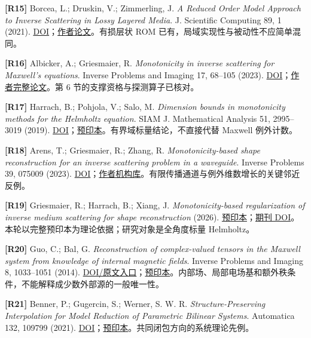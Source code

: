 \documentclass[11pt,a4paper]{article}
\begin{document}
\textbf{{[}R15{]}} Borcea, L.; Druskin, V.; Zimmerling, J. \emph{A
Reduced Order Model Approach to Inverse Scattering in Lossy Layered
Media}. J. Scientific Computing 89, 1 (2021).
\href{https://doi.org/10.1007/s10915-021-01616-7}{DOI}；\href{https://public.websites.umich.edu/~borcea/Publications/ROM_LOSSY.pdf}{作者论文}。有损层状
ROM 已有，局域实现性与被动性不应简单混同。

\textbf{{[}R16{]}} Albicker, A.; Griesmaier, R. \emph{Monotonicity in
inverse scattering for Maxwell's equations}. Inverse Problems and
Imaging 17, 68--105 (2023).
\href{https://doi.org/10.3934/ipi.2022032}{DOI}；\href{https://ianm.math.kit.edu/downloads/rg-ip/griesmaier/monotonicitymaxwell.pdf}{作者完整论文}。第
6 节的支撑资格与探测算子已核对。

\textbf{{[}R17{]}} Harrach, B.; Pohjola, V.; Salo, M. \emph{Dimension
bounds in monotonicity methods for the Helmholtz equation}. SIAM J.
Mathematical Analysis 51, 2995--3019 (2019).
\href{https://doi.org/10.1137/19M1240708}{DOI}；\href{https://arxiv.org/abs/1901.08495}{预印本}。有界域标量结论，不直接代替
Maxwell 例外计数。

\textbf{{[}R18{]}} Arens, T.; Griesmaier, R.; Zhang, R.
\emph{Monotonicity-based shape reconstruction for an inverse scattering
problem in a waveguide}. Inverse Problems 39, 075009 (2023).
\href{https://doi.org/10.1088/1361-6420/acd4e0}{DOI}；\href{https://publikationen.bibliothek.kit.edu/1000160558}{作者机构库}。有限传播通道与例外维数增长的关键邻近反例。

\textbf{{[}R19{]}} Griesmaier, R.; Harrach, B.; Xiang, J.
\emph{Monotonicity-based regularization of inverse medium scattering for
shape reconstruction} (2026).
\href{https://arxiv.org/html/2602.02052v1}{预印本}；\href{https://doi.org/10.1137/26M1854318}{期刊
DOI}。本轮以完整预印本为理论依据；研究对象是全角度标量 Helmholtz。

\textbf{{[}R20{]}} Guo, C.; Bal, G. \emph{Reconstruction of
complex-valued tensors in the Maxwell system from knowledge of internal
magnetic fields}. Inverse Problems and Imaging 8, 1033--1051 (2014).
\href{https://www.aimsciences.org/article/doi/10.3934/ipi.2014.8.1033}{DOI/原文入口}；\href{https://arxiv.org/abs/1308.5872}{预印本}。内部场、局部电场基和额外秩条件，不能解释成少数外部源的一般唯一性。

\textbf{{[}R21{]}} Benner, P.; Gugercin, S.; Werner, S. W. R.
\emph{Structure-Preserving Interpolation for Model Reduction of
Parametric Bilinear Systems}. Automatica 132, 109799 (2021).
\href{https://doi.org/10.1016/j.automatica.2021.109799}{DOI}；\href{https://arxiv.org/abs/2007.11269}{预印本}。共同闭包方向的系统理论先例。
\end{document}

